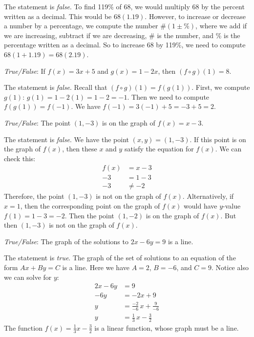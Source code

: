 \documentclass[11pt,letterpaper]{article}
\begin{document}
\sol The statement is \textit{false}. To find 119\% of 68, we would multiply 68 by the percent written as a decimal. This would be $68(1.19)$. However, to increase or decrease a number by a percentage, we compute the number $\#(1 \pm \%)$, where we add if we are increasing, subtract if we are decreasing, $\#$ is the number, and \% is the percentage written as a decimal. So to increase 68 by 119\%, we need to compute $68(1 + 1.19)= 68(2.19)$. \pvspace{1.5cm}



\newpage



\quizsol \textit{True/False}: If $f(x)= 3x + 5$ and $g(x)= 1 - 2x$, then $(f \circ g)(1)= 8$. \pspace

\sol The statement is \textit{false}. Recall that $(f \circ g)(1)= f(g(1))$. First, we compute $g(1)$: $g(1)= 1 - 2(1)= 1 - 2= -1$. Then we need to compute $f(g(1))= f(-1)$. We have $f(-1)= 3(-1) + 5= -3 + 5= 2$. \pvspace{1.5cm}



\quizsol \textit{True/False}: The point $(1, -3)$ is on the graph of $f(x)= x - 3$. \pspace

\sol The statement is \textit{false}. We have the point $(x, y)= (1, -3)$. If this point is on the graph of $f(x)$, then these $x$ and $y$ satisfy the equation for $f(x)$. We can check this:
	\[
	\begin{aligned}
	f(x)&= x - 3 \\
	-3&= 1 - 3 \\
	-3&\neq -2
	\end{aligned}
	\]
Therefore, the point $(1, -3)$ is not on the graph of $f(x)$. Alternatively, if $x= 1$, then the corresponding point on the graph of $f(x)$ would have $y$-value $f(1)= 1 - 3= -2$. Then the point $(1, -2)$ is on the graph of $f(x)$. But then $(1, -3)$ is not on the graph of $f(x)$. \pvspace{1.5cm}



\quizsol \textit{True/False}: The graph of the solutions to $2x - 6y= 9$ is a line. \pspace

\sol The statement is \textit{true}. The graph of the set of solutions to an equation of the form $Ax + By= C$ is a line. Here we have $A= 2$, $B= -6$, and $C= 9$. Notice also we can solve for $y$:
	\[
	\begin{aligned}
	2x - 6y&= 9 \\
	-6y&= -2x + 9 \\
	y&= \frac{-2}{-6}\,x + \frac{9}{-6} \\
	y&= \frac{1}{3}\,x - \frac{3}{2}
	\end{aligned}
	\]
The function $f(x)= \frac{1}{3}x - \frac{3}{2}$ is a linear function, whose graph must be a line. \pvspace{1.3cm}
\end{document}
